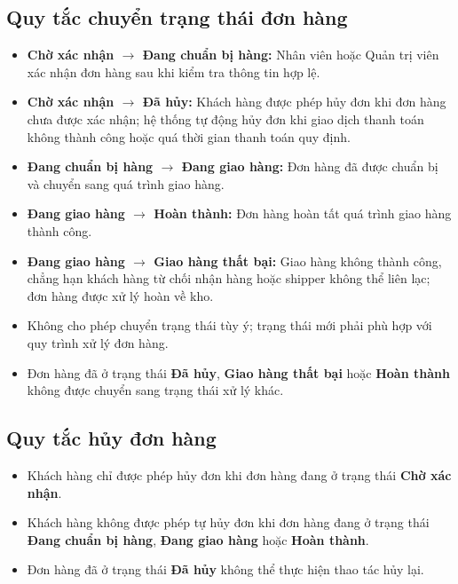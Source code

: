 \subsection{Quy tắc chuyển trạng thái đơn hàng}

\begin{itemize}
\item \textbf{Chờ xác nhận $\rightarrow$ Đang chuẩn bị hàng:} Nhân viên hoặc Quản trị viên xác nhận đơn hàng sau khi kiểm tra thông tin hợp lệ.

\item \textbf{Chờ xác nhận $\rightarrow$ Đã hủy:} Khách hàng được phép hủy đơn khi đơn hàng chưa được xác nhận; hệ thống tự động hủy đơn khi giao dịch thanh toán không thành công hoặc quá thời gian thanh toán quy định.

\item \textbf{Đang chuẩn bị hàng $\rightarrow$ Đang giao hàng:} Đơn hàng đã được chuẩn bị và chuyển sang quá trình giao hàng.

\item \textbf{Đang giao hàng $\rightarrow$ Hoàn thành:} Đơn hàng hoàn tất quá trình giao hàng thành công.

\item \textbf{Đang giao hàng $\rightarrow$ Giao hàng thất bại:} Giao hàng không thành công, chẳng hạn khách hàng từ chối nhận hàng hoặc shipper không thể liên lạc; đơn hàng được xử lý hoàn về kho.

\item Không cho phép chuyển trạng thái tùy ý; trạng thái mới phải phù hợp với quy trình xử lý đơn hàng.

\item Đơn hàng đã ở trạng thái \textbf{Đã hủy}, \textbf{Giao hàng thất bại} hoặc \textbf{Hoàn thành} không được chuyển sang trạng thái xử lý khác.
\end{itemize}
\subsection{Quy tắc hủy đơn hàng}
\begin{itemize}
    \item Khách hàng chỉ được phép hủy đơn khi đơn hàng đang ở trạng thái \textbf{Chờ xác nhận}.
    \item Khách hàng không được phép tự hủy đơn khi đơn hàng đang ở trạng thái \textbf{Đang chuẩn bị hàng}, \textbf{Đang giao hàng} hoặc \textbf{Hoàn thành}.
    \item Đơn hàng đã ở trạng thái \textbf{Đã hủy} không thể thực hiện thao tác hủy lại.
\end{itemize}

